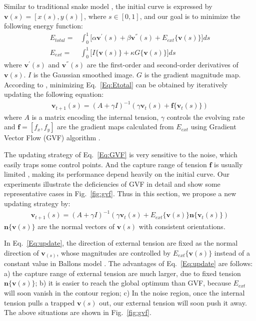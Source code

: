 Similar to traditional snake model \cite{Kass1988}, the initial curve is expressed by $\mathbf{v}(s)=[x(s),y(s)]$, where $s\in[0,1]$, and our goal is to minimize the following energy function:
\begin{eqnarray}\label{Eq:Etotal}
E_{total} =& \int_{0}^{1}\big[\alpha\mathbf{v}^{'}(s)+\beta\mathbf{v}^{''}(s)+E_{ext}\{\mathbf{v}(s)\}\big]ds \\
E_{ext} =& \int_{0}^{1}\big[I\{\mathbf{v}(s)\} + \kappa G\{\mathbf{v}(s)\}\big]ds\nonumber
\end{eqnarray}
where $\mathbf{v}^{'}(s)$ and $\mathbf{v}^{''}(s)$ are the first-order and second-order derivatives of $\mathbf{v}(s)$.
$I$ is the Gaussian smoothed image.
$G$ is the gradient magnitude map.
According to \cite{Kass1988}, minimizing Eq.~\ref{Eq:Etotal} can be obtained by iteratively updating the following equation:
\begin{eqnarray}\label{Eq:GVF}
\mathbf{v}_{t+1}(s) = (A+\gamma I)^{-1}(\gamma \mathbf{v}_t(s)+\mathbf{f}\{\mathbf{v}_t(s)\})
\end{eqnarray}
where $A$ is a matrix encoding the internal tension, $\gamma$ controls the evolving rate and $\mathbf{f}=[f_{x},f_{y}]$ are the gradient maps calculated from $E_{ext}$ using Gradient Vector Flow (GVF) algorithm \cite{Xu1998}.

The updating strategy of Eq.~\ref{Eq:GVF} is very sensitive to the noise, which easily traps some control points.
And the capture range of tension $\mathbf{f}$ is usually limited \cite{Cohen1991}, making its performance depend heavily on the initial curve.
Our experiments illustrate the deficiencies of GVF in detail and show some representative cases in Fig.~\ref{fig:gvf}.
Thus in this section, we propose a new updating strategy by:
\begin{eqnarray}\label{Eq:update}
\mathbf{v}_{t+1}(s) = (A+\gamma I)^{-1}(\gamma \mathbf{v}_t(s)+E_{ext}\{\mathbf{v}(s)\}\mathbf{n}\{\mathbf{v}_t(s)\})
\end{eqnarray}
$\mathbf{n}\{\mathbf{v}(s)\}$ are the normal vectors of $\mathbf{v}(s)$ with consistent orientations.

In Eq.~\ref{Eq:update}, the direction of external tension are fixed as the normal direction of $\mathbf{v}_(s)$, whose magnitudes are controlled by $E_{ext}\{\mathbf{v}(s)\}$ instead of a constant value in Ballons model \cite{Cohen1991}.
The advantages of Eq.~\ref{Eq:update} are follows:
a) the capture range of external tension are much larger, due to fixed tension $\mathbf{n}\{\mathbf{v}(s)\}$;
b) it is easier to reach the global optimum than GVF, because $E_{ext}$ will soon vanish in the contour region;
c) In the noise region, once the internal tension pulls a trapped $\mathbf{v}(s)$ out, our external tension will soon push it away.
The above situations are shown in Fig.~\ref{fig:gvf}.


